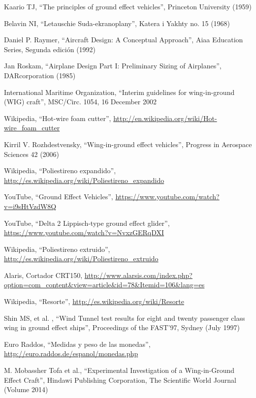     Kaario TJ,
    “The principles of ground effect vehicles”,
    Princeton University (1959)

    Belavin NI,
    “Letauschie Suda-ekranoplany”,
    Katera i Yakhty no. 15 (1968)

    Daniel P. Raymer,
    “Aircraft Design: A Conceptual Approach”,
    Aiaa Education Series, Segunda edición (1992)

    Jan Roskam,
    “Airplane Design Part I: Preliminary Sizing of Airplanes”,
    DARcorporation (1985)

    International Maritime Organization,
    “Interim guidelines for wing-in-ground (WIG) craft”,
    MSC/Circ. 1054, 16 December 2002

	Wikipedia,
	“Hot-wire foam cutter”,
	\scriptsize \url{http://en.wikipedia.org/wiki/Hot-wire_foam_cutter} \normalsize

	Kirril V. Rozhdestvensky,
	“Wing-in-ground effect vehicles”,
	Progress in Aerospace Sciences 42 (2006)
	
	Wikipedia,
	“Poliestireno expandido”,
	\scriptsize \url{http://es.wikipedia.org/wiki/Poliestireno_expandido} \normalsize

	YouTube,
	“Ground Effect Vehicles”,
	\scriptsize \url{https://www.youtube.com/watch?v=i9sHtVzdW8Q} \normalsize
	
	YouTube,
	“Delta 2 Lippisch-type ground effect glider”,
	\scriptsize \url{https://www.youtube.com/watch?v=NvxzGERqDXI} \normalsize
	
	Wikipedia,
	“Poliestireno extruido”,
	\scriptsize \url{http://es.wikipedia.org/wiki/Poliestireno_extruido} \normalsize

	Alaris,
	Cortador CRT150,
	\scriptsize \url{http://www.alarsis.com/index.php?option=com_content&view=article&id=78&Itemid=106&lang=es} \normalsize

	Wikipedia,
	“Resorte”,
	\scriptsize \url{http://es.wikipedia.org/wiki/Resorte} \normalsize
	
	Shin MS, et al. ,
	“Wind Tunnel test results for eight and twenty passenger class wing in ground effect ships”,
	Proceedings of the FAST’97, Sydney (July 1997)

	Euro Raddos,
	“Medidas y peso de las monedas”,
	\scriptsize \url{http://euro.raddos.de/espanol/monedas.php} \normalsize
	
	M. Mobassher Tofa et al.,
	“Experimental Investigation of a Wing-in-Ground Effect Craft”,
	Hindawi Publishing Corporation, The Scientific World Journal (Volume 2014)
	


	
	